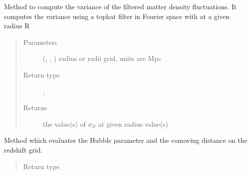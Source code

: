 \documentclass[letterpaper,10pt,english]{sphinxmanual}
\begin{document}
\begin{fulllineitems}
\begin{fulllineitems}
\end{fulllineitems}


\begin{fulllineitems}
\label{\detokenize{api/seyfert.cosmology.cosmology.Cosmology:seyfert.cosmology.cosmology.Cosmology.computeSigmaR}}
\sphinxAtStartPar
Method to compute the variance of the filtered matter density fluctuations.
It computes the variance using a top\sphinxhyphen{}hat filter in Fourier space with at a given radius R
\begin{quote}\begin{description}
\item[{Parameters}] \leavevmode
\sphinxAtStartPar
{} (\sphinxcode{\sphinxupquote{Union}}{[}, , \sphinxcode{\sphinxupquote{ndarray}}{]}) \textendash{} radius or radii grid, units are Mpc

\item[{Return type}] \leavevmode
\sphinxAtStartPar
\sphinxcode{\sphinxupquote{Union}}{[}, \sphinxcode{\sphinxupquote{ndarray}}{]}

\item[{Returns}] \leavevmode
\sphinxAtStartPar
the value(s) of \(\sigma_R\) at given radius value(s)

\end{description}\end{quote}

\end{fulllineitems}


\begin{fulllineitems}
\label{\detokenize{api/seyfert.cosmology.cosmology.Cosmology:seyfert.cosmology.cosmology.Cosmology.evaluateOverRedshiftGrid}}
\sphinxAtStartPar
Method which evaluates the Hubble parameter and the comoving distance on the redshift grid.
\begin{quote}\begin{description}
\item[{Return type}] \leavevmode
\sphinxAtStartPar
{}


\end{description}
\end{quote}
\end{fulllineitems}
\end{fulllineitems}
\end{document}
